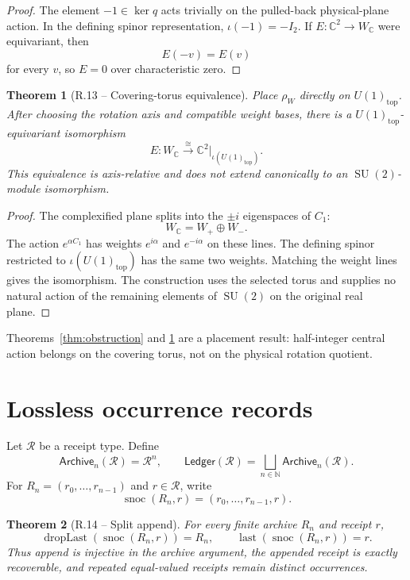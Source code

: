\documentclass[11pt,letterpaper]{article}
\theoremstyle{returnstyle}
\newtheorem{theorem}{Theorem}[section]
\newcommand{\C}{\mathbb{C}}
\newcommand{\N}{\mathbb{N}}
\newcommand{\SU}{\operatorname{SU}}
\newcommand{\Archive}{\mathsf{Archive}}
\newcommand{\Ledger}{\mathsf{Ledger}}
\newcommand{\snoc}{\operatorname{snoc}}
\newcommand{\dropLast}{\operatorname{dropLast}}
\newcommand{\last}{\operatorname{last}}
\begin{document}
\begin{proof}
The element $-1\in\ker q$ acts trivially on the pulled-back physical-plane action.  In the defining spinor representation, $\iota(-1)=-I_2$.  If $E:\C^2\to W_\C$ were equivariant, then
\[
E(-v)=E(v)
\]
for every $v$, so $E=0$ over characteristic zero.
\end{proof}

\begin{theorem}[R.13 -- Covering-torus equivalence]\label{thm:torus}
Place $\rho_W$ directly on $U(1)_{\mathrm{top}}$.  After choosing the rotation axis and compatible weight bases, there is a $U(1)_{\mathrm{top}}$-equivariant isomorphism
\[
E:W_\C\overset{\cong}{\longrightarrow}\C^2\big|_{\iota(U(1)_{\mathrm{top}})}.
\]
This equivalence is axis-relative and does not extend canonically to an $\SU(2)$-module isomorphism.
\end{theorem}

\begin{proof}
The complexified plane splits into the $\pm i$ eigenspaces of $C_1$:
\[
W_\C=W_+\oplus W_-.
\]
The action $e^{\alpha C_1}$ has weights $e^{i\alpha}$ and $e^{-i\alpha}$ on these lines.  The defining spinor restricted to $\iota(U(1)_{\mathrm{top}})$ has the same two weights.  Matching the weight lines gives the isomorphism.  The construction uses the selected torus and supplies no natural action of the remaining elements of $\SU(2)$ on the original real plane.
\end{proof}

Theorems~\ref{thm:obstruction} and \ref{thm:torus} are a placement result: half-integer central action belongs on the covering torus, not on the physical rotation quotient.

\section{Lossless occurrence records}\label{sec:ledger}

Let $\mathcal R$ be a receipt type.  Define
\[
\Archive_n(\mathcal R)=\mathcal R^n,
\qquad
\Ledger(\mathcal R)=\bigsqcup_{n\in\N}\Archive_n(\mathcal R).
\]
For $R_n=(r_0,\ldots,r_{n-1})$ and $r\in\mathcal R$, write
\[
\snoc(R_n,r)=(r_0,\ldots,r_{n-1},r).
\]

\begin{theorem}[R.14 -- Split append]\label{thm:append}
For every finite archive $R_n$ and receipt $r$,
\[
\dropLast(\snoc(R_n,r))=R_n,
\qquad
\last(\snoc(R_n,r))=r.
\]
Thus append is injective in the archive argument, the appended receipt is exactly recoverable, and repeated equal-valued receipts remain distinct occurrences.
\end{theorem}
\end{document}
